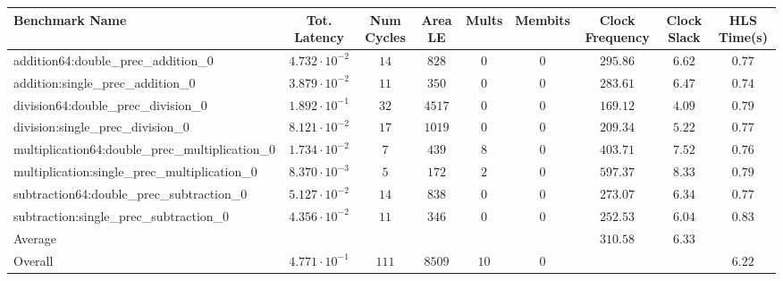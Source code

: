 \begin{tabular}{|l|c|c|c|c|c|c|c|c|}
\hline
Benchmark Name                                   & Tot. Latency            & Num Cycles & Area LE  & Mults  & Membits & Clock Frequency & Clock Slack & HLS Time(s) \\
\hline
addition64:double\_prec\_addition\_0             & $ 4.732 \cdot 10^{-2} $ & $ 14     $ & $ 828  $ & $ 0  $ & $ 0   $ & $ 295.86      $ & $ 6.62    $ & $ 0.77    $ \\
addition:single\_prec\_addition\_0               & $ 3.879 \cdot 10^{-2} $ & $ 11     $ & $ 350  $ & $ 0  $ & $ 0   $ & $ 283.61      $ & $ 6.47    $ & $ 0.74    $ \\
division64:double\_prec\_division\_0             & $ 1.892 \cdot 10^{-1} $ & $ 32     $ & $ 4517 $ & $ 0  $ & $ 0   $ & $ 169.12      $ & $ 4.09    $ & $ 0.79    $ \\
division:single\_prec\_division\_0               & $ 8.121 \cdot 10^{-2} $ & $ 17     $ & $ 1019 $ & $ 0  $ & $ 0   $ & $ 209.34      $ & $ 5.22    $ & $ 0.77    $ \\
multiplication64:double\_prec\_multiplication\_0 & $ 1.734 \cdot 10^{-2} $ & $ 7      $ & $ 439  $ & $ 8  $ & $ 0   $ & $ 403.71      $ & $ 7.52    $ & $ 0.76    $ \\
multiplication:single\_prec\_multiplication\_0   & $ 8.370 \cdot 10^{-3} $ & $ 5      $ & $ 172  $ & $ 2  $ & $ 0   $ & $ 597.37      $ & $ 8.33    $ & $ 0.79    $ \\
subtraction64:double\_prec\_subtraction\_0       & $ 5.127 \cdot 10^{-2} $ & $ 14     $ & $ 838  $ & $ 0  $ & $ 0   $ & $ 273.07      $ & $ 6.34    $ & $ 0.77    $ \\
subtraction:single\_prec\_subtraction\_0         & $ 4.356 \cdot 10^{-2} $ & $ 11     $ & $ 346  $ & $ 0  $ & $ 0   $ & $ 252.53      $ & $ 6.04    $ & $ 0.83    $ \\
\hline
Average                                          & $                     $ & $        $ & $      $ & $    $ & $     $ & $ 310.58      $ & $ 6.33    $ & $         $ \\
\hline
Overall                                          & $ 4.771 \cdot 10^{-1} $ & $ 111    $ & $ 8509 $ & $ 10 $ & $ 0   $ & $             $ & $         $ & $ 6.22    $ \\
\hline
\end{tabular}

